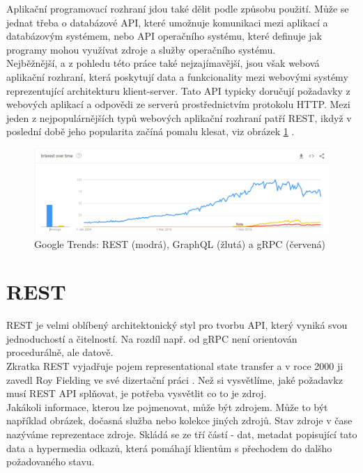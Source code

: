 \documentclass[thesis=M,czech]{FITthesis}[2019/12/23]
\begin{document}
Aplikační programovací rozhraní jdou také dělit podle způsobu použití. Může se jednat třeba o databázové API, které umožnuje komunikaci mezi aplikací a databázovým systémem, nebo API operačního systému, které definuje jak programy mohou využívat zdroje a služby operačního systému.\\
Nejběžnější, a z pohledu této práce také nejzajímavější, jsou však webová aplikační rozhraní, která poskytují data a funkcionality mezi webovými systémy reprezentující architekturu klient-server. Tato API typicky doručují požadavky z webových aplikací a odpovědi ze serverů prostřednictvím protokolu HTTP. Mezi jeden z nejpopulárnějších typů webových aplikační rozhraní patří REST, ikdyž v poslední době jeho popularita začíná pomalu klesat, viz obrázek \ref{google_trends_img} \cite{google-trends}.

\begin{figure}[h]
    \includegraphics[width=\linewidth]{img/interest_trend.png}
    \caption{Google Trends: REST (modrá), GraphQL (žlutá) a gRPC (červená)}
	\label{google_trends_img}
\end{figure}

\section{REST}
REST je velmi oblíbený architektonický styl pro tvorbu API, který vyniká svou jednoduchostí a čitelností. Na rozdíl např. od gRPC není orientován procedurálně, ale datově.\\
Zkratka REST vyjadřuje pojem representational state transfer a v roce 2000 ji zavedl Roy Fielding ve své dizertační práci \cite{fielding00}. Než si vysvětlíme, jaké požadavkz musí REST API splňovat, je potřeba vysvětlit co to je zdroj.\\
Jakákoli informace, kterou lze pojmenovat, může být zdrojem. Může to být například obrázek, dočasná služba nebo kolekce jiných zdrojů. Stav zdroje v čase nazýváme reprezentace zdroje. Skládá se ze tří částí - dat, metadat popisující tato data a hypermedia odkazů, která pomáhají klientům s přechodem do dalšho požadovaného stavu.
\end{document}
